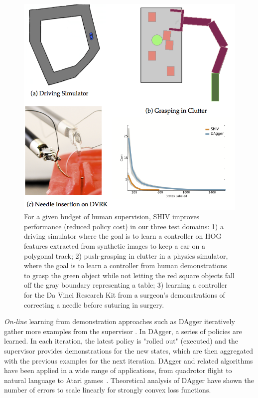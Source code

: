 \documentclass[10pt, conference]{ieeeconf}      %
\begin{document}
\begin{figure}[t!]
\centering
\includegraphics[width=\columnwidth]{figures/teaser.pdf}
\caption{ 
For a given budget of human supervision, SHIV improves performance (reduced policy cost) in our three test domains: 1) a driving simulator where the goal is to learn a controller on HOG features extracted from synthetic images to keep a car on a polygonal track; 2) push-grasping in clutter in a physics simulator, where the goal is to learn a controller from human demonstrations to grasp the green object while not letting the red square objects fall off the gray boundary representing a table; 3) learning a controller for the Da Vinci Research Kit from a surgeon's demonstrations of correcting a needle before suturing in surgery. 
}
\vspace*{-10pt}
\label{fig:teaser}
\end{figure}


\emph{On-line} learning from demonstration approaches such as DAgger iteratively gather more examples from the supervisor \cite{grollman2007dogged,ross2010efficient,ross2010reduction}. In DAgger, a series of policies are learned.  In each iteration, the latest policy is "rolled out" (executed) and the supervisor provides demonstrations for the  new states, which are then aggregated with the previous examples for the next iteration. DAgger and related algorithms have been applied in a wide range of applications, from quadrotor flight to natural language to Atari games~\cite{NIPS2014_5421,duvallet2013imitation,ross2013learning}. Theoretical analysis of DAgger have shown the number of errors to scale linearly for strongly convex loss functions. 
\end{document}
